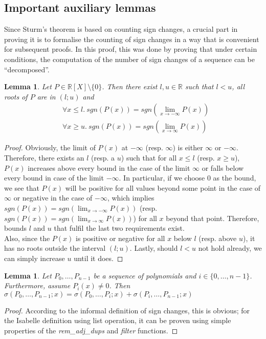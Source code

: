 \documentclass[11pt,a4paper,oneside]{article}
\newtheorem{lemma}[definition]{Lemma}
\newcommand{\RR}{\mathbb{R}}
\newcommand{\sgn}{\mathit{sgn}}
\begin{document}
\subsection{Important auxiliary lemmas}

Since Sturm's theorem is based on counting sign changes, a crucial part in proving it is to formalise the counting of sign changes in a way that is convenient for subsequent proofs. In this proof, this was done by proving that under certain conditions, the computation of the number of sign changes of a sequence can be \enquote{decomposed}.

\begin{lemma}\label{thm:limits}
Let $P\in\RR[X]\setminus\{0\}$. Then there exist $l,u\in\RR$ such that $l<u$, all roots of $P$ are in $(l;u)$ and
\begin{align*}
&\forall x\leq l.\ \sgn(P(x)) = \sgn\left(\lim\limits_{x\to -\infty} P(x)\right)\\
&\forall x\geq u.\ \sgn(P(x)) = \sgn\left(\lim\limits_{x\to \infty} P(x)\right)
\end{align*}
\end{lemma}
\begin{proof}
Obviously, the limit of $P(x)$ at $-\infty$ (resp. $\infty$) is either $\infty$ or $-\infty$. Therefore, there exists an $l$ (resp. a $u$) such that for all $x\leq l$ (resp. $x\geq u$), $P(x)$ increases above every bound in the case of the limit $\infty$ or falls below every bound in case of the limit $-\infty$. In particular, if we choose 0 as the bound, we see that $P(x)$ will be positive for all values beyond some point in the case of $\infty$ or negative in the case of $-\infty$, which implies $\sgn(P(x)) = \sgn(\lim_{x\to -\infty} P(x))$ (resp. $\sgn(P(x)) = \sgn(\lim_{x\to \infty} P(x))$) for all $x$ beyond that point. Therefore, bounds $l$ and $u$ that fulfil the last two requirements exist.\\
Also, since the $P(x)$ is positive or negative for all $x$ below $l$ (resp. above $u$), it has no roots outside the interval $(l;u)$. Lastly, should $l<u$ not hold already, we can simply increase $u$ until it does.
\end{proof}

\begin{lemma}\label{thm:sign_changes_distrib}
Let $P_0, \ldots, P_{n-1}$ be a sequence of polynomials and $i\in\{0,\ldots,n-1\}$. Furthermore, assume $P_i(x) \neq 0$. Then $\sigma(P_0,\ldots,P_{n-1}; x) = \sigma(P_0,\ldots,P_i; x)+\sigma(P_i,\ldots,P_{n-1}; x)$
\end{lemma}
\begin{proof}
According to the informal definition of sign changes, this is obvious; for the Isabelle definition using list operation, it can be proven using simple properties of the \emph{rem\_adj\_dups} and \emph{filter} functions.
\end{proof}
\end{document}
